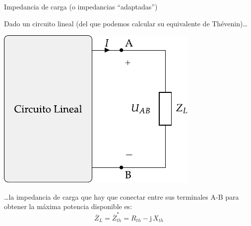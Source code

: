 \documentclass[aspectratio=169, usenames,svgnames,dvipsnames]{beamer}
\begin{document}
\begin{frame}{Impedancia de carga \hspace{3mm} (o impedancias ``adaptadas'')}

    \vspace{2mm}
    Dado un circuito lineal (del que podemos calcular su equivalente de Thévenin)\ldots{}
    \begin{center}
        \includegraphics[height=0.45\textheight]{../figs/EquivalenteThevenin.pdf}
    \end{center}
    
    \ldots{}la \alert{impedancia de carga} que hay que conectar entre sus terminales A-B para obtener la máxima potencia disponible es:
    \[
      \boxed{\overline{Z}_L = \overline{Z}_{th}^* = R_{th} - \mathrm{j}\,X_{th}}
    \]
\end{frame}

\end{document}
